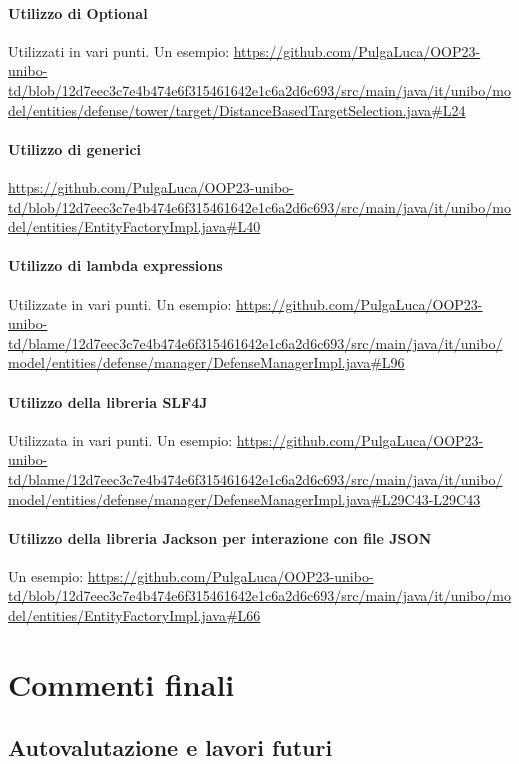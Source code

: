 \documentclass[a4paper,12pt]{report}
\begin{document}
\subsubsection{Utilizzo di Optional}
Utilizzati in vari punti. Un esempio: 
\url{https://github.com/PulgaLuca/OOP23-unibo-td/blob/12d7eec3c7e4b474e6f315461642e1c6a2d6c693/src/main/java/it/unibo/model/entities/defense/tower/target/DistanceBasedTargetSelection.java#L24}

\subsubsection{Utilizzo di generici}
\url{https://github.com/PulgaLuca/OOP23-unibo-td/blob/12d7eec3c7e4b474e6f315461642e1c6a2d6c693/src/main/java/it/unibo/model/entities/EntityFactoryImpl.java#L40}

\subsubsection{Utilizzo di lambda expressions}
Utilizzate in vari punti. Un esempio:  
\url{https://github.com/PulgaLuca/OOP23-unibo-td/blame/12d7eec3c7e4b474e6f315461642e1c6a2d6c693/src/main/java/it/unibo/model/entities/defense/manager/DefenseManagerImpl.java#L96}

\subsubsection{Utilizzo della libreria SLF4J}
Utilizzata in vari punti. Un esempio:  
\url{https://github.com/PulgaLuca/OOP23-unibo-td/blame/12d7eec3c7e4b474e6f315461642e1c6a2d6c693/src/main/java/it/unibo/model/entities/defense/manager/DefenseManagerImpl.java#L29C43-L29C43}

\subsubsection{Utilizzo della libreria Jackson per interazione con file JSON}
Un esempio:  
\url{https://github.com/PulgaLuca/OOP23-unibo-td/blob/12d7eec3c7e4b474e6f315461642e1c6a2d6c693/src/main/java/it/unibo/model/entities/EntityFactoryImpl.java#L66}



\chapter{Commenti finali}
\section{Autovalutazione e lavori futuri}
\end{document}
